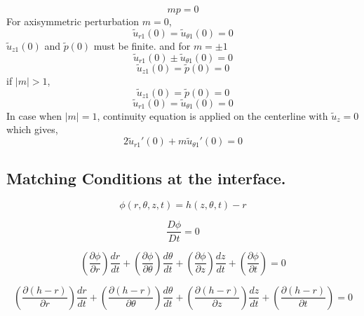 \documentclass{article}
\begin{document}
\begin{equation}
mp = 0
\end{equation}
For axisymmetric perturbation $m = 0$,
\begin{equation}
\tilde{u}_{r1}(0) = \tilde{u}_{\theta1}(0) = 0 
\end{equation}
$ \tilde{u}_{z1}(0)$ and $\tilde{p}(0)$ must be finite.
and for $m =\pm 1$
\begin{equation}
\tilde{u}_{r1}(0) \pm  \tilde{u}_{\theta1}(0) = 0 
\end{equation}
\begin{equation}
 \tilde{u}_{z1}(0)=\tilde{p}(0)=0
\end{equation}
if $|m| > 1$,
\begin{equation}
 \tilde{u}_{z1}(0)=\tilde{p}(0)=0
\end{equation}
\begin{equation}
\tilde{u}_{r1}(0)= \tilde{u}_{\theta1}(0) = 0
\end{equation}
In case when $|m| =1$, continuity equation is applied on the centerline with $\tilde{u}_{z} = 0$ which gives,
\begin{equation}
2\tilde{u}_{r1}'(0) + m\tilde{u}_{\theta1}'(0) = 0
\end{equation}

\subsection{Matching Conditions at the interface.}


\begin{equation}
\phi(r,\theta,z,t)=h(z,\theta,t)-r
\end{equation}


\begin{equation}
\frac{D\phi}{Dt}=0
\end{equation}


\begin{equation}
\left(\frac{\partial\phi}{\partial r}\right)\frac{dr}{dt}+\left(\frac{\partial\phi}{\partial\theta}\right)\frac{d\theta}{dt}+\left(\frac{\partial\phi}{\partial z}\right)\frac{dz}{dt}+\left(\frac{\partial\phi}{\partial t}\right)=0
\end{equation}


\begin{equation}
\left(\frac{\partial(h-r)}{\partial r}\right)\frac{dr}{dt}+\left(\frac{\partial(h-r)}{\partial\theta}\right)\frac{d\theta}{dt}+\left(\frac{\partial(h-r)}{\partial z}\right)\frac{dz}{dt}+\left(\frac{\partial(h-r)}{\partial t}\right)=0
\end{equation}
\end{document}
